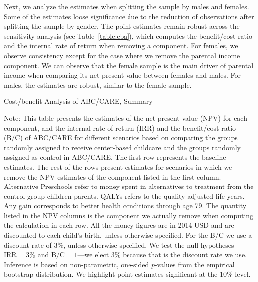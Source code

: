 Next, we analyze the estimates when splitting the sample by males and females. Some of the estimates loose significance due to the reduction of observations after splitting the sample by gender. The point estimates remain robust across  the sensitivity analysis (see Table~\ref{table:cba}), which computes the benefit/cost ratio and the internal rate of return when removing a component. For females, we observe consistency except for the case where we remove the parental income component. We can observe that the female sample is the main driver of parental income when comparing its net present value between females and males. For males, the estimates are robust, similar to the female sample.

\begin{table}[!htbp]
\centering
\caption{Cost/benefit Analysis of ABC/CARE, Summary}\label{table:cba}
\begin{adjustbox}{max width=\textwidth}
\begin{threeparttable}

\begin{tablenotes}
\footnotesize
\item Note: This table presents the estimates of the net present value (NPV) for each component, and the internal rate of return (IRR) and the benefit/cost ratio (B/C) of ABC/CARE for different scenarios based on comparing the groups randomly assigned to receive center-based childcare and the groups randomly assigned as control in ABC/CARE. The first row represents the baseline estimates. The rest of the rows present estimates for scenarios in which we remove the NPV estimates of the component listed in the first column. Alternative Preschools refer to money spent in alternatives to treatment from the control-group children parents. QALYs refers to the quality-adjusted life years. Any gain corresponds to better health conditions through age 79. The quantity listed in the NPV columns is the component we actually remove when computing the calculation in each row. All the money figures are in 2014 USD and are discounted to each child's birth, unless otherwise specified. For the B/C we use a discount rate of $3\%$, unless otherwise specified. We test the null hypotheses $\text{IRR} = 3\%$ and $\text{B/C} = 1$---we elect $3\%$ because that is the discount rate we use. Inference is based on non-parametric, one-sided $p$-values from the empirical bootstrap distribution. We highlight point estimates significant at the $10\%$ level.
\end{tablenotes}
\end{threeparttable}
\end{adjustbox}
\end{table}

